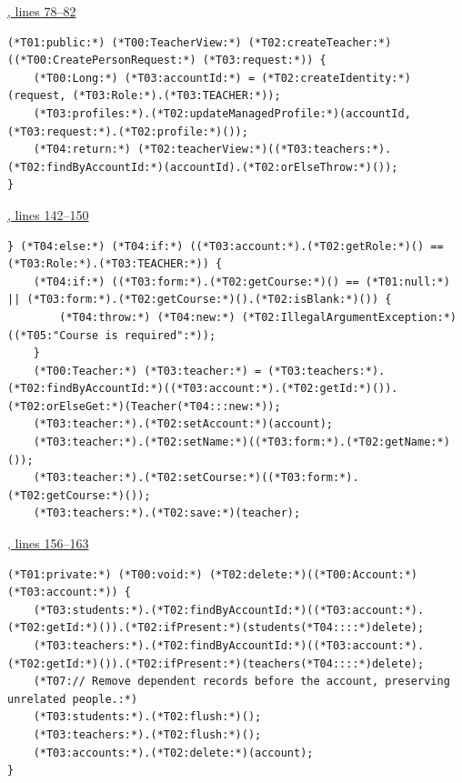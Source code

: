 \par\smallskip
{\small\href{\repo/blob/5d22aed7f6d4ef1e4c0b0c0dabf2962ba4b47608/src/main/java/com/example/fmschool/service/PeopleApiService.java#L78-L82}{, lines 78--82}}
\begin{lstlisting}[style=vsJava,firstnumber=78]
(*T01:public:*) (*T00:TeacherView:*) (*T02:createTeacher:*)((*T00:CreatePersonRequest:*) (*T03:request:*)) {
    (*T00:Long:*) (*T03:accountId:*) = (*T02:createIdentity:*)(request, (*T03:Role:*).(*T03:TEACHER:*));
    (*T03:profiles:*).(*T02:updateManagedProfile:*)(accountId, (*T03:request:*).(*T02:profile:*)());
    (*T04:return:*) (*T02:teacherView:*)((*T03:teachers:*).(*T02:findByAccountId:*)(accountId).(*T02:orElseThrow:*)());
}
\end{lstlisting}

\par\smallskip
{\small\href{\repo/blob/5d22aed7f6d4ef1e4c0b0c0dabf2962ba4b47608/src/main/java/com/example/fmschool/service/ProfileService.java#L142-L150}{, lines 142--150}}
\begin{lstlisting}[style=vsJava,firstnumber=142]
} (*T04:else:*) (*T04:if:*) ((*T03:account:*).(*T02:getRole:*)() == (*T03:Role:*).(*T03:TEACHER:*)) {
    (*T04:if:*) ((*T03:form:*).(*T02:getCourse:*)() == (*T01:null:*) || (*T03:form:*).(*T02:getCourse:*)().(*T02:isBlank:*)()) {
        (*T04:throw:*) (*T04:new:*) (*T02:IllegalArgumentException:*)((*T05:"Course is required":*));
    }
    (*T00:Teacher:*) (*T03:teacher:*) = (*T03:teachers:*).(*T02:findByAccountId:*)((*T03:account:*).(*T02:getId:*)()).(*T02:orElseGet:*)(Teacher(*T04:::new:*));
    (*T03:teacher:*).(*T02:setAccount:*)(account);
    (*T03:teacher:*).(*T02:setName:*)((*T03:form:*).(*T02:getName:*)());
    (*T03:teacher:*).(*T02:setCourse:*)((*T03:form:*).(*T02:getCourse:*)());
    (*T03:teachers:*).(*T02:save:*)(teacher);
\end{lstlisting}

\par\smallskip
{\small\href{\repo/blob/5d22aed7f6d4ef1e4c0b0c0dabf2962ba4b47608/src/main/java/com/example/fmschool/service/ProfileService.java#L156-L163}{, lines 156--163}}
\begin{lstlisting}[style=vsJava,firstnumber=156]
(*T01:private:*) (*T00:void:*) (*T02:delete:*)((*T00:Account:*) (*T03:account:*)) {
    (*T03:students:*).(*T02:findByAccountId:*)((*T03:account:*).(*T02:getId:*)()).(*T02:ifPresent:*)(students(*T04::::*)delete);
    (*T03:teachers:*).(*T02:findByAccountId:*)((*T03:account:*).(*T02:getId:*)()).(*T02:ifPresent:*)(teachers(*T04::::*)delete);
    (*T07:// Remove dependent records before the account, preserving unrelated people.:*)
    (*T03:students:*).(*T02:flush:*)();
    (*T03:teachers:*).(*T02:flush:*)();
    (*T03:accounts:*).(*T02:delete:*)(account);
}
\end{lstlisting}


